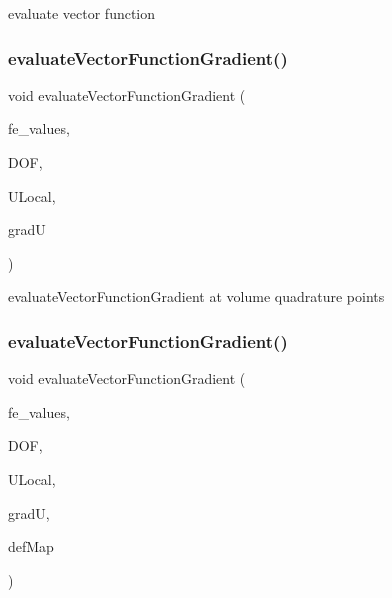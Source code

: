 evaluate vector function \mbox{\label{group___evaluation_functions_ga84eb2ee714466f113c96fcf6a9fd23e8}} 
\subsubsection{\texorpdfstring{evaluateVectorFunctionGradient()}{evaluateVectorFunctionGradient()}\hspace{0.1cm}{\footnotesize\ttfamily [1/4]}}
{\footnotesize\ttfamily void evaluate\+Vector\+Function\+Gradient (\begin{DoxyParamCaption}\item[{const F\+E\+Values$<$ dim $>$ \&}]{fe\+\_\+values,  }\item[{unsigned int}]{D\+OF,  }\item[{Table$<$ 1, T $>$ \&}]{U\+Local,  }\item[{Table$<$ 3, T $>$ \&}]{gradU }\end{DoxyParamCaption})}

evaluate\+Vector\+Function\+Gradient at volume quadrature points \mbox{\label{group___evaluation_functions_ga5adf8aa2d91dbdf393aa91dcc65e42e8}} 
\subsubsection{\texorpdfstring{evaluateVectorFunctionGradient()}{evaluateVectorFunctionGradient()}\hspace{0.1cm}{\footnotesize\ttfamily [2/4]}}
{\footnotesize\ttfamily void evaluate\+Vector\+Function\+Gradient (\begin{DoxyParamCaption}\item[{const F\+E\+Values$<$ dim $>$ \&}]{fe\+\_\+values,  }\item[{unsigned int}]{D\+OF,  }\item[{Table$<$ 1, T $>$ \&}]{U\+Local,  }\item[{Table$<$ 3, T $>$ \&}]{gradU,  }\item[{\mbox{\hyperlink{structdeformation_map}{deformation\+Map}}$<$ T, dim $>$ \&}]{def\+Map }\end{DoxyParamCaption})}

